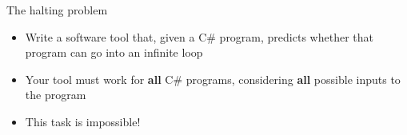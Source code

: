 \begin{frame}{The halting problem}
	\begin{itemize}
		\pause\item Write a software tool that, given a C\# program, predicts whether that program can go into an infinite loop
		\pause\item Your tool must work for \textbf{all} C\# programs, considering \textbf{all} possible inputs to the program
		\pause\item This task is impossible!
	\end{itemize}
\end{frame}
